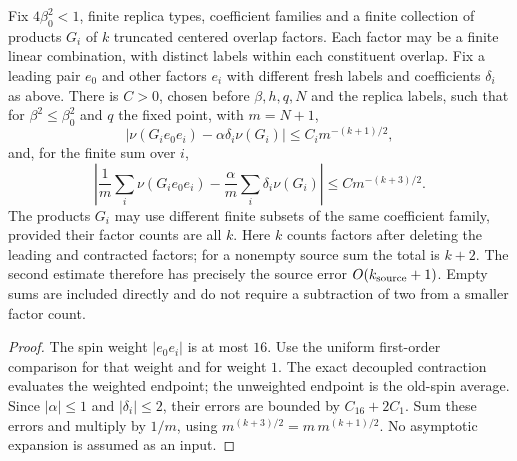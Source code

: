 \begin{theorem}
\label{thm:sg-tal:term-I-pairing-sum}
\leanok
{}
Fix $4\beta_0^2<1$, finite replica types, coefficient families and a finite collection
of products $G_i$ of $k$ truncated centered overlap factors. Each factor may be a finite
linear combination, with distinct labels within each constituent overlap. Fix a leading
pair $e_0$ and other factors $e_i$ with different fresh labels and coefficients $\delta_i$
as above. There is $C>0$, chosen before $\beta,h,q,N$ and the replica labels, such that
for $\beta^2\le\beta_0^2$ and $q$ the fixed point, with $m=N+1$,
\[
 |\nu(G_i e_0 e_i)-\alpha\delta_i\nu(G_i)|\le C_i m^{-(k+1)/2},
\]
and, for the finite sum over $i$,
\[
 \left|\frac1m\sum_i\nu(G_i e_0 e_i)
       -\frac{\alpha}{m}\sum_i\delta_i\nu(G_i)\right|
 \le C m^{-(k+3)/2}.
\]
The products $G_i$ may use different finite subsets of the same coefficient family,
provided their factor counts are all $k$. Here $k$ counts factors after deleting the
leading and contracted factors; for a nonempty source sum the total is $k+2$. The second
estimate therefore has precisely the source error $O(k_{\rm source}+1)$. Empty sums are
included directly and do not require a subtraction of two from a smaller factor count.
\end{theorem}
\begin{proof}
\leanok
The spin weight $|e_0e_i|$ is at most $16$. Use the uniform first-order comparison for
that weight and for weight $1$. The exact decoupled contraction evaluates the weighted
endpoint; the unweighted endpoint is the old-spin average. Since $|\alpha|\le1$ and
$|\delta_i|\le2$, their errors are bounded by $C_{16}+2C_1$.
Sum these errors and multiply by $1/m$, using
$m^{(k+3)/2}=m\,m^{(k+1)/2}$. No asymptotic expansion is assumed as an input.
\end{proof}

